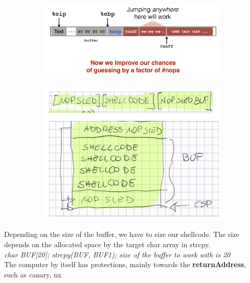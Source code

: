 \documentclass[11pt, oneside]{article}   	%
\begin{document}
\begin{figure}
\begin{subfigure}{0.4\linewidth}
\includegraphics[width=\linewidth]{nop}
\end{subfigure}
\hfill
\begin{subfigure}{0.4\linewidth}
\includegraphics[width=\linewidth]{nopsled}
\end{subfigure}
\end{figure}
Depending on the size of the buffer, we have to size our shellcode. The size depends on the allocated space by the target char array in strcpy.\\ \emph{char BUF[20]; strcpy(BUF, BUF1); size of the buffer to work with is 20}\\
The computer by itself has protections, mainly towards the \textbf{returnAddress}, such as canary, nx
\end{document}

